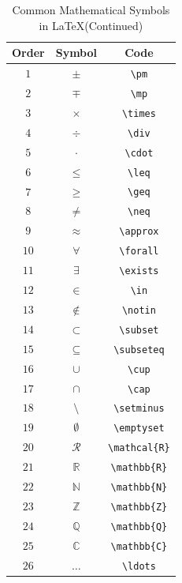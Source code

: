 \documentclass[12pt]{article}
\begin{document}
\begin{table}[h!]
\centering
\begin{tabular}{|c|c|c|}
\hline
Order & Symbol & Code \\
\hline
$1$ & $\pm$ & \verb|\pm| \\
\hline
$2$ & $\mp$ & \verb|\mp| \\
\hline
$3$ & $\times$ & \verb|\times| \\
\hline
$4$ & $\div$ & \verb|\div| \\
\hline
$5$ & $\cdot$ & \verb|\cdot| \\
\hline
$6$ & $\leq$ & \verb|\leq| \\
\hline
$7$ & $\geq$ & \verb|\geq| \\
\hline
$8$ & $\neq$ & \verb|\neq| \\
\hline
$9$ & $\approx$ & \verb|\approx| \\
\hline
$10$ & $\forall$ & \verb|\forall| \\
\hline      
$11$ & $\exists$ & \verb|\exists| \\
\hline
$12$ & $\in$ & \verb|\in| \\
\hline
$13$ & $\notin$ & \verb|\notin| \\
\hline
$14$ & $\subset$ & \verb|\subset| \\
\hline
$15$ & $\subseteq$ & \verb|\subseteq| \\
\hline
$16$ & $\cup$ & \verb|\cup| \\
\hline
$17$ & $\cap$ & \verb|\cap| \\
\hline
$18$ & $\setminus$ & \verb|\setminus| \\
\hline
$19$ & $\emptyset$ & \verb|\emptyset| \\
\hline
$20$ & $\mathcal{R}$ & \verb|\mathcal{R}| \\
\hline
$21$ & $\mathbb{R}$ & \verb|\mathbb{R}| \\
\hline
$22$ & $\mathbb{N}$ & \verb|\mathbb{N}| \\
\hline
$23$ & $\mathbb{Z}$ & \verb|\mathbb{Z}| \\
\hline
$24$ & $\mathbb{Q}$ & \verb|\mathbb{Q}| \\
\hline
$25$ & $\mathbb{C}$ & \verb|\mathbb{C}| \\
\hline
$26$ & $\ldots$ & \verb|\ldots| \\
\hline
\end{tabular}
\caption{Common Mathematical Symbols in \LaTeX (Continued)}
\label{tab:common-math-symbols-2}
\end{table}
\end{document}
